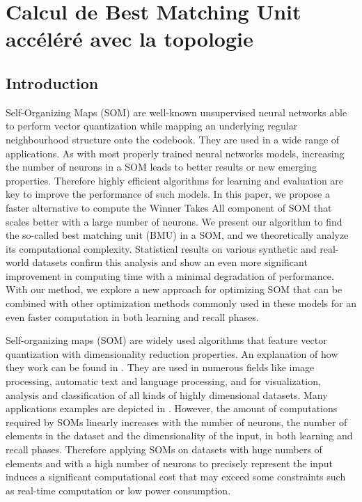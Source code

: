 
\chapter{Calcul de Best Matching Unit accéléré avec la topologie}
	\minitoc
	\newpage




	\section{Introduction}

	Self-Organizing Maps (SOM) are well-known unsupervised neural networks able to perform vector quantization while mapping an underlying regular neighbourhood structure onto the codebook. They are used in a wide range of applications. As with most properly trained neural networks models, increasing the number of neurons in a SOM leads to better results or new emerging properties. Therefore highly efficient algorithms for learning and evaluation are key to improve the performance of such models. In this paper, we propose a faster alternative to compute the Winner Takes All component of SOM that scales better with a large number of neurons. We present our algorithm to find the so-called best matching unit (BMU) in a SOM, and we theoretically analyze its computational complexity. Statistical results on various synthetic and real-world datasets confirm this analysis and show an even more significant improvement in computing time with a minimal degradation of performance. With our method, we explore a new approach for optimizing SOM that can be combined with other optimization methods commonly used in these models for an even faster computation in both learning and recall phases.

	Self-organizing maps (SOM) are widely used algorithms that feature vector quantization with dimensionality reduction properties. An explanation of how they work can be found in \cite{kohonen2007kohonen}. They are used in numerous fields like image processing, automatic text and language processing, and for visualization, analysis and classification of all kinds of highly dimensional datasets. Many applications examples are depicted in \cite{cottrell:hal-01796059}. However, the amount of computations required by SOMs linearly increases with the number of neurons, the number of elements in the dataset and the dimensionality of the input, in both learning and recall phases. Therefore applying SOMs on datasets with huge numbers of elements and with a high number of neurons to precisely represent the input induces a significant computational cost that may exceed some constraints such as real-time computation or low power consumption.

